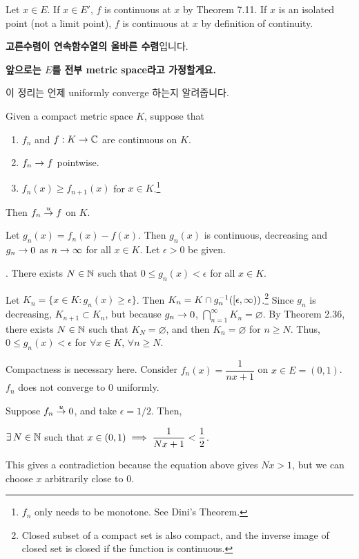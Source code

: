 \pf Let \(x \in E\). If \(x \in E'\), \(f\) is continuous at \(x\) by Theorem 7.11. If \(x\) is an isolated point (not a limit point), \(f\) is continuous at \(x\) by definition of continuity.

\textbf{고른수렴이 연속함수열의 올바른 수렴}입니다.

\textbf{앞으로는 \(E\)를 전부 metric space라고 가정할게요.}

이 정리는 언제 uniformly converge 하는지 알려줍니다.

 Given a compact metric space \(K\), suppose that
\begin{enumerate}
    \item \(f_n\) and \(f: K \rightarrow \mathbb{C}\) are continuous on \(K\).
    \item \(f_n \rightarrow f\) pointwise.
    \item \(f_n(x) \geq f_{n+1}(x)\) for \(x \in K\).\footnote{\(f_n\) only needs to be monotone. See Dini's Theorem.}
\end{enumerate}
Then \(f_n \overset{u}{\rightarrow} f\) on \(K\).

\pf Let \(g_n(x) = f_n(x) - f(x)\). Then \(g_n(x)\) is continuous, decreasing and \(g_n \rightarrow 0\) as \(n \rightarrow \infty\) for all \(x \in K\). Let \(\epsilon > 0\) be given.

\quad \claim. There exists \(N \in \mathbb{N}\) such that \(0 \leq g_n(x) < \epsilon\) for all \(x \in K\).

\quad \pf Let \(K_n = \{x \in K : g_n(x)\geq \epsilon\}\). Then \(K_n = K \cap g_n^{-1} ([\epsilon, \infty))\).\footnote{Closed subset of a compact set is also compact, and the inverse image of closed set is closed if the function is continuous.} Since \(g_n\) is decreasing, \(K_{n+1}\subset K_n\), but because \(g_n \rightarrow 0\), \(\bigcap_{n=1}^\infty K_n = \varnothing\). By Theorem 2.36, there exists \(N \in \mathbb{N}\) such that \(K_N = \varnothing\), and then \(K_n = \varnothing\) for \(n \geq N\). Thus, \(0 \leq g_n(x) < \epsilon\) for \(\forall x \in K\), \(\forall n \geq N\).

\rmk Compactness is necessary here. Consider \(f_n(x) = \dfrac{1}{nx + 1}\) on \(x \in E = (0, 1)\). \(f_n\) does not converge to \(0\) uniformly.

\pf Suppose \(f_n \overset{u}{\rightarrow} 0\), and take \(\epsilon = 1/2\). Then,
\begin{center}
    \(\exists N \in \N\) such that \(\displaystyle x \in (0, 1) \implies \frac{1}{Nx + 1} < \frac{1}{2}\).
\end{center}
This gives a contradiction because the equation above gives \(Nx > 1\), but we can choose \(x\) arbitrarily close to \(0\).

